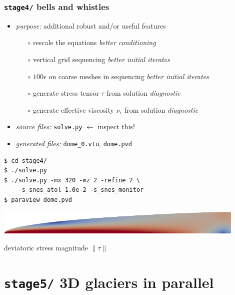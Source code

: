\documentclass[10pt,
               hyperref={colorlinks,citecolor=DeepPink4,linkcolor=black,urlcolor=blue},
               svgnames]{beamer}
\newcommand{\eps}{\epsilon}
\begin{document}
\begin{frame}[fragile]
\frametitle{\texttt{stage4/} \qquad bells and whistles}

\begin{itemize}
\item \emph{purpose:} additional robust and/or useful features
    \begin{itemize}
    \item[$\circ$] rescale the equations  \hfill \emph{better conditioning}
    \item[$\circ$] vertical grid sequencing  \hfill \emph{better initial iterates}
    \item[$\circ$] $100\eps$ on coarse meshes in sequencing  \hfill \emph{better initial iterates}
    \item[$\circ$] generate stress tensor $\tau$ from solution  \hfill \emph{diagnostic}
    \item[$\circ$] generate effective viscosity $\nu_\eps$ from solution  \hfill \emph{diagnostic}
    \end{itemize}
\item \emph{source files:} \texttt{solve.py} \hfill \alert{$\gets$ inspect this!}
\item \emph{generated files:} \texttt{dome\_0.vtu}, \texttt{dome.pvd}
\end{itemize}

\bigskip
\begin{Verbatim}
$ cd stage4/
$ ./solve.py
$ ./solve.py -mx 320 -mz 2 -refine 2 \
    -s_snes_atol 1.0e-2 -s_snes_monitor
$ paraview dome.pvd
\end{Verbatim}

\bigskip
\begin{center}
\includegraphics[width=0.9\textwidth]{figs/stage4.png}

{\tiny deviatoric stress magnitude $\|\tau\|$}
\end{center}
\end{frame}


\section{\texttt{stage5/} \qquad 3D glaciers in parallel}
\end{document}
